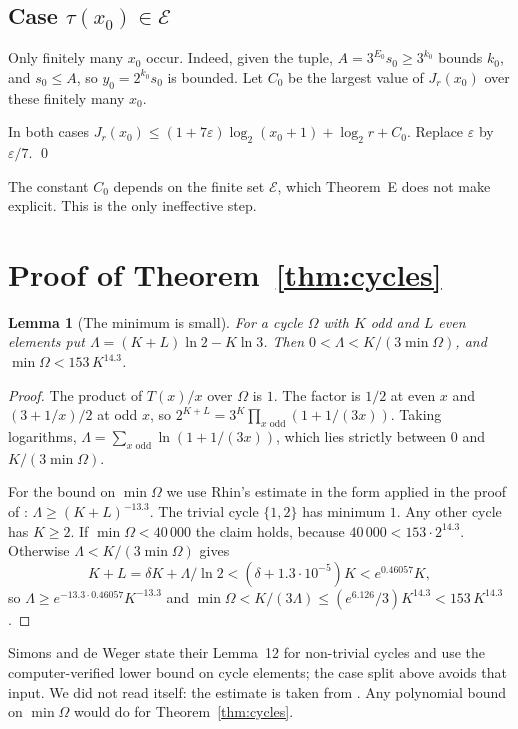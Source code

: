 \documentclass[11pt]{amsart}
\newtheorem{lemma}{Lemma}
\theoremstyle{remark}
\newcommand{\Om}{\Omega}
\begin{document}
\subsection*{Case $\tau(x_0)\in\mathcal{E}$}
Only finitely many $x_0$ occur. Indeed, given the tuple, $A=3^{E_0}s_0\ge 3^{k_0}$ bounds
$k_0$, and $s_0\le A$, so $y_0=2^{k_0}s_0$ is bounded. Let $C_0$ be the largest value of
$J_r(x_0)$ over these finitely many $x_0$.

In both cases $J_r(x_0)\le(1+7\varepsilon)\log_2(x_0+1)+\log_2r+C_0$. Replace $\varepsilon$
by $\varepsilon/7$. \qed

\medskip
The constant $C_0$ depends on the finite set $\mathcal{E}$, which Theorem~E does not make
explicit. This is the only ineffective step.

\section{Proof of Theorem~\ref{thm:cycles}}

\begin{lemma}[The minimum is small]\label{lem:min}
For a cycle $\Om$ with $K$ odd and $L$ even elements put $\Lambda=(K+L)\ln2-K\ln3$. Then
$0<\Lambda<K/(3\min\Om)$, and $\min\Om<153\,K^{14.3}$.
\end{lemma}

\begin{proof}
The product of $T(x)/x$ over $\Om$ is $1$. The factor is $1/2$ at even $x$ and $(3+1/x)/2$
at odd $x$, so $2^{K+L}=3^K\prod_{x\text{ odd}}(1+1/(3x))$. Taking logarithms,
$\Lambda=\sum_{x\text{ odd}}\ln(1+1/(3x))$, which lies strictly between $0$ and
$K/(3\min\Om)$.

For the bound on $\min\Om$ we use Rhin's estimate \cite{Rhin} in the form applied in the
proof of \cite[Lemma~12]{SdW}: $\Lambda\ge(K+L)^{-13.3}$. The trivial cycle $\{1,2\}$ has
minimum $1$. Any other cycle has $K\ge 2$. If $\min\Om<40\,000$ the claim holds, because
$40\,000<153\cdot2^{14.3}$. Otherwise $\Lambda<K/(3\min\Om)$ gives
\[
K+L=\delta K+\Lambda/\ln2<(\delta+1.3\cdot10^{-5})K<e^{0.46057}K,
\]
so $\Lambda\ge e^{-13.3\cdot0.46057}K^{-13.3}$ and
$\min\Om<K/(3\Lambda)\le(e^{6.126}/3)K^{14.3}<153\,K^{14.3}$.
\end{proof}

Simons and de Weger state their Lemma~12 for non-trivial cycles and use the
computer-verified lower bound on cycle elements; the case split above avoids that input. We
did not read \cite{Rhin} itself: the estimate is taken from \cite{SdW}. Any polynomial bound
on $\min\Om$ would do for Theorem~\ref{thm:cycles}.
\end{document}
